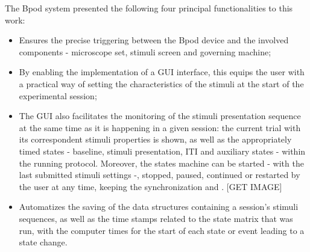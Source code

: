 The Bpod system presented the following four principal functionalities to this work:

\begin{itemize}
\item Ensures the precise triggering between the Bpod device and the involved components - microscope set, stimuli screen and governing machine;
\item By enabling the implementation of a GUI interface, this equips the user with a practical way of setting the characteristics of the stimuli at the start of the experimental session;
\item The GUI also facilitates the monitoring of the stimuli presentation sequence at the same time as it is happening in a given session: the current trial with its correspondent stimuli properties is shown, as well as the appropriately timed states - baseline, stimuli presentation, ITI and auxiliary states - within the running protocol. Moreover, the states machine can be started - with the last submitted stimuli settings -, stopped, paused, continued or restarted by the user at any time, keeping the synchronization and . [GET IMAGE] 
\item Automatizes the saving of the data structures containing a session's stimuli sequences, as well as the time stamps related to the state matrix that was run, with the computer times for the start of each state or event leading to a state change.
\end{itemize}

